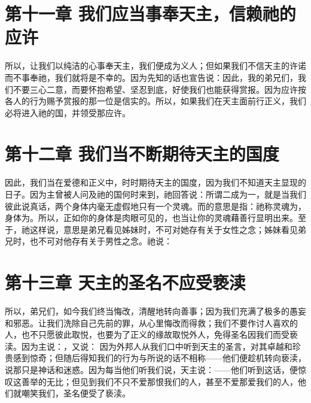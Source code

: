 
\section{第十一章 我们应当事奉天主，信赖祂的应许}

所以，让我们以纯洁的心事奉天主，我们便成为义人；但如果我们不信天主的许诺而不事奉祂，我们就将是不幸的。因为先知的话也宣告说：因此，我的弟兄们，我们不要三心二意，而要怀抱希望、坚忍到底，好使我们也能获得赏报。因为应许按各人的行为赐予赏报的那一位是信实的。所以，如果我们在天主面前行正义，我们必将进入祂的国，并领受那应许。\par


\section{第十二章  我们当不断期待天主的国度}

因此，我们当在爱德和正义中，时时期待天主的国度，因为我们不知道天主显现的日子。因为主曾被人问及祂的国何时来到，祂回答说：所谓二成为一，就是当我们彼此说真话，两个身体内毫无虚假地只有一个灵魂。而的意思是指：祂称灵魂为，身体为。所以，正如你的身体是肉眼可见的，也当让你的灵魂藉善行显明出来。至于，祂这样说，意思是弟兄看见姊妹时，不可对她存有关于女性之念；姊妹看见弟兄时，也不可对他存有关于男性之念。祂说：\par


\section{第十三章  天主的圣名不应受亵渎}

所以，弟兄们，如今我们终当悔改，清醒地转向善事；因为我们充满了极多的愚妄和邪恶。让我们洗除自己先前的罪，从心里悔改而得救；我们不要作讨人喜欢的人，也不只愿彼此取悦，也要为了正义的缘故取悦外人，免得圣名因我们而受亵渎。因为主说：，又说： 因为外邦人从我们口中听到天主的圣言，对其卓越和珍贵感到惊奇；但随后得知我们的行为与所说的话不相称——他们便趁机转向亵渎，说那只是神话和迷惑。因为每当他们听我们说，天主说：——他们听到这话，便惊叹这善举的无比；但见到我们不只不爱那恨我们的人，甚至不爱那爱我们的人，他们就嘲笑我们，圣名便受了亵渎。\par

